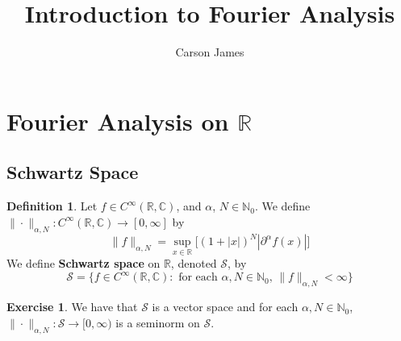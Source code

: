 \documentclass[12pt]{amsart}
\theoremstyle{definition}
\newtheorem{defn}[definition]{Definition}
\newtheorem{ex}[definition]{Exercise}
\newcommand{\p}{\partial}
\newcommand{\al}{\alpha}
\newcommand{\C}{\mathbb{C}}
\newcommand{\N}{\mathbb{N}}
\newcommand{\R}{\mathbb{R}}
\newcommand{\MS}{\mathcal{S}}
\newcommand{\RG}{[0,\infty]}
\newcommand{\Rg}{[0,\infty)}
\newcommand{\ld}[1]{\label{defn:#1}}
\begin{document}
	
	\title{Introduction to Fourier Analysis}
	\author{Carson James}
	\maketitle
	
	\tableofcontents
	
	\newpage
	\section{Fourier Analysis on $\R$}	
	
	\subsection{Schwartz Space}
	
	\begin{defn}
		\ld{101} Let $f \in C^{\infty}(\R, \C)$, and $\al$, $N \in \N_0$. We define $\| \cdot \|_{\al, N}: C^{\infty}(\R, \C) \rightarrow \RG$ by 
		$$\|f\|_{\al, N} = \sup_{x \in \R} \bigg[  (1 + |x|)^N |\p^{\al}f (x)| \bigg] $$
		We define \textbf{Schwartz space} on $\R$, denoted $\MS$, by $$\MS = \{f \in C^{\infty}(\R, \C): \text{ for each $\al, N \in \N_0$, } \|f\|_{\al, N} < \infty\}$$
	\end{defn}

	\begin{ex} We have that $\MS$ is a vector space and for each $\al, N \in \N_0$,  $\| \cdot \|_{\al, N}: \MS \rightarrow \Rg$ is a seminorm on $\MS$.
	\end{ex}
\end{document}

